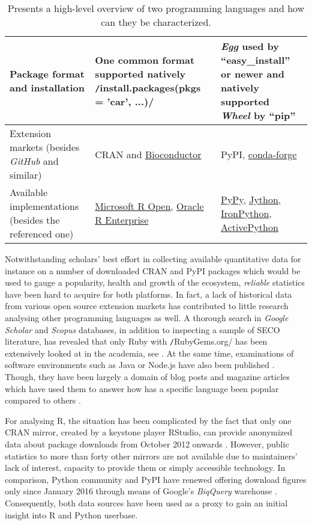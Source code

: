 \begin{sidewaystable}
\begin{tabular}{|C{5cm}|C{0.37\textwidth}|C{0.37\textwidth}|}
    Package format and installation & One common format supported natively \texttt/install.packages(pkgs = 'car', ...)/ & \emph{Egg} used by \enquote{easy\_install} or newer and natively supported \emph{Wheel} by \enquote{pip} \\ \hline
    Extension markets (besides \emph{GitHub} and similar) & \ac{CRAN} and \href{https://www.bioconductor.org/}{Bioconductor} & \ac{PyPI}, \href{https://conda-forge.org/}{conda-forge} \\ \hline
    Available implementations (besides the referenced one) & \href{https://mran.microsoft.com/}{Microsoft R Open}, \href{http://www.oracle.com/technetwork/database/database-technologies/r/r-enterprise/overview/index.html}{Oracle R Enterprise} & \href{https://pypy.org/}{PyPy}, \href{http://www.jython.org/}{Jython}, \href{http://ironpython.net/}{IronPython}, \href{https://www.activestate.com/activepython}{ActivePython} \\ \hline
    \end{tabular}
    \caption{Presents a high-level overview of two programming languages and how can they be characterized.}
  	\label{tab:RvsPython}
\end{sidewaystable}
Notwithstanding scholars' best effort in collecting available quantitative data for instance on a number of downloaded \ac{CRAN} and \ac{PyPI} packages which would be used to gauge a popularity, health and growth of the ecosystem, \emph{reliable} statistics have been hard to acquire for both platforms.
In fact, a lack of historical data from various open source extension markets has contributed to little research analysing other programming languages as well.
A thorough search in \emph{Google Scholar} and \emph{Scopus} databases, in addition to inspecting a sample of \ac{SECO} literature, has revealed that only Ruby with \texttt/RubyGems.org/ has been extensively looked at in the academia, see \textcite{Syed2013OnEcosystems}.
At the same time, examinations of software environments such as Java or Node.js have also been published \parencite{Eleni2017}. 
Though, they have been largely a domain of blog posts and magazine articles which have used them to answer how has a specific language been popular compared to others \parencites{ErikWittern2016AnNpm}{KristianPoslek2015OverviewJavaScript}{DavidStackOverflow2017}{CharlesHumble2012OracleEcosystem}.

For analysing R, the situation has been complicated by the fact that only one \ac{CRAN} mirror, created by a keystone player RStudio, can provide anonymized data about package downloads from October 2012 onwards \parencite{HadleyWickham2013TheMirror}.
However, public statistics to more than forty other mirrors are not available due to maintainers' lack of interest, capacity to provide them or simply accessible technology.
In comparison, Python community and \ac{PyPI} have renewed offering download figures only since January 2016 through means of Google's \emph{BiqQuery} warehouse \parencite{DonaldStufft2016PubliclyStatistics}.
Consequently, both data sources have been used as a proxy to gain an initial insight into R and Python userbase.

